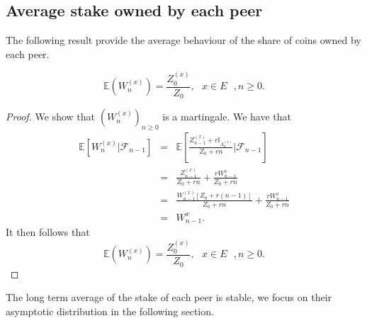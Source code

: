 \subsection{Average stake owned by each peer}
The following result provide the average behaviour of the share of coins owned by each peer.
\begin{prop}\label{prop:average_stakes}
$$
\mathbb{E}\left(W_n^{(x)}\right) = \frac{Z_0^{(x)}}{Z_0},\text{ }x\in E\text{ }, n\geq0.
$$
\end{prop}
\begin{proof}
We show that $(W_n^{(x)})_{n\geq0}$ is a martingale. We have that 
\begin{eqnarray*}
\mathbb{E}\left[W_n^{(x)}|\mathcal{F}_{n-1}\right]&=& \mathbb{E}\left[\frac{Z^{(x)}_{n-1} + r\mathbb{I}_{A_n^{(x)}}}{Z_0 + rn}\Big \rvert\mathcal{F}_{n-1}\right]\\
&=& \frac{Z^{(x)}_{n-1} }{Z_0 + rn}+\frac{rW_{n-1}^{x}}{Z_0 + rn}\\\
&=& \frac{W_{n-1}^{(x)}[Z_0 + r(n-1)]}{Z_0 + rn}+\frac{rW_{n-1}^{x}}{Z_0 + rn}\\
&=&W_{n-1}^{x}.
\end{eqnarray*}
It then follows that 
$$
\mathbb{E}\left(W_n^{(x)}\right) = \frac{Z_0^{(x)}}{Z_0},\text{ }x\in E\text{ }, n\geq0.
$$
\end{proof}
The long term average of the stake of each peer is stable, we focus on their asymptotic distribution in the following section.

